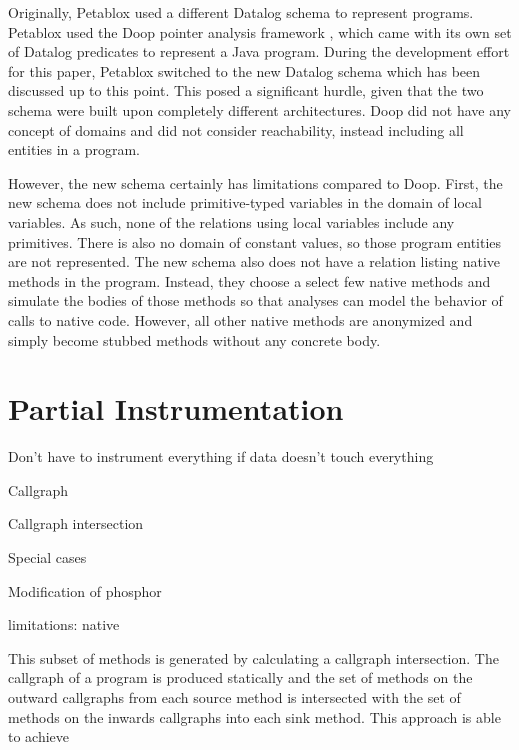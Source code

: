 Originally, Petablox used a different Datalog schema to represent programs. Petablox used the Doop pointer analysis framework \cite{doop}, which came with its own set of Datalog predicates to represent a Java program. During the development effort for this paper, Petablox switched to the new Datalog schema which has been discussed up to this point. This posed a significant hurdle, given that the two schema were built upon completely different architectures. Doop did not have any concept of domains and did not consider reachability, instead including all entities in a program.  

However, the new schema certainly has limitations compared to Doop. First, the new schema does not include primitive-typed variables in the domain of local variables. As such, none of the relations using local variables include any primitives. There is also no domain of constant values, so those program entities are not represented. The new schema also does not have a relation listing native methods in the program. Instead, they choose a select few native methods and simulate the bodies of those methods so that analyses can model the behavior of calls to native code. However, all other native methods are anonymized and simply become stubbed methods without any concrete body.
\section{Partial Instrumentation}
Don't have to instrument everything if data doesn't touch everything

Callgraph

Callgraph intersection

Special cases

Modification of phosphor

limitations: native

This subset of methods is generated by calculating a callgraph intersection. The callgraph of a program is produced statically and the set of methods on the outward callgraphs from each source method is intersected with the set of methods on the inwards callgraphs into each sink method. This approach is able to achieve 

